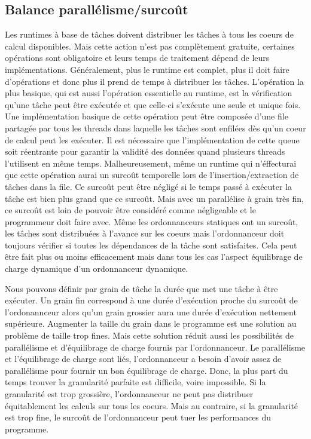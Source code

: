 \subsection{Balance parallélisme/surcoût}
Les runtimes à base de tâches doivent distribuer les tâches à tous les coeurs de calcul disponibles.
%
Mais cette action n'est pas complètement gratuite, certaines opérations sont obligatoire et leurs temps de traitement dépend de leurs implémentations.
%
Généralement, plus le runtime est complet, plus il doit faire d'opérations et donc plus il prend de temps à distribuer les tâches.
%
L'opération la plus basique, qui est aussi l'opération essentielle au runtime, est la vérification qu'une tâche peut être exécutée et que celle-ci s'exécute une seule et unique fois.
%
Une implémentation basique de cette opération peut être composée d'une file partagée par tous les threads dans laquelle les tâches sont enfilées dès qu'un coeur de calcul peut les exécuter.
%
Il est nécessaire que l'implémentation de cette queue soit réentrante pour garantir la validité des données quand plusieurs threads l'utilisent en même temps.
%
Malheureusement, même un runtime qui n'éffecturai que cette opération aurai un surcoût temporelle lors de l'insertion/extraction de tâches dans la file.
%
Ce surcoût peut être négligé si le temps passé à exécuter la tâche est bien plus grand que ce surcoût.
%
Mais avec un parallélise à grain très fin, ce surcoût est loin de pouvoir être considéré comme négligeable et le programmeur doit faire avec.
%
Même les ordonnanceurs statiques ont un surcoût, les tâches sont distribuées à l'avance sur les coeurs mais l'ordonnanceur doit toujours vérifier si toutes les dépendances de la tâche sont satisfaites.
%
Cela peut être fait plus ou moins efficacement mais dans tous les cas l'aspect équilibrage de charge dynamique d'un ordonnanceur dynamique.


Nous pouvons définir par grain de tâche la durée que met une tâche à être exécuter.
%
Un grain fin correspond à une durée d'exécution proche du surcoût de l'ordonannceur alors qu'un grain grossier aura une durée d'exécution nettement supérieure.
%
Augmenter la taille du grain dans le programme est une solution au problème de taille trop fines.
%
Mais cette solution réduit aussi les possibilités de parallélisme et d'équilibrage de charge fournis par l'ordonnanceur.
%
Le parallélisme et l'équilibrage de charge sont liés, l'ordonnanceur a besoin d'avoir assez de parallélisme pour fournir un bon équilibrage de charge.
%
Donc, la plus part du temps trouver la granularité parfaite est difficile, voire impossible.
%
Si la granularité est trop grossière, l'ordonnanceur ne peut pas distribuer équitablement les calculs sur tous les coeurs.
%
Mais au contraire, si la granularité est trop fine, le surcoût de l'ordonnanceur peut tuer les performances du programme.


